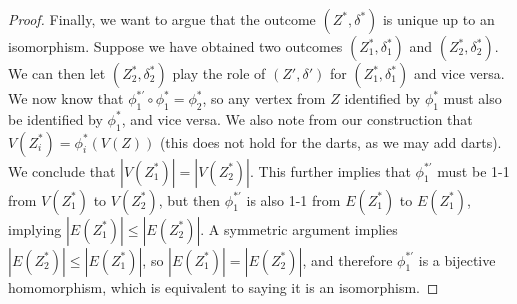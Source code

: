 \documentclass[10pt,a4paper]{amsart}
\begin{document}
\begin{proof}
Finally, we want to argue that the outcome $(Z^*,\delta^*)$ is unique up to an isomorphism. 
Suppose we have obtained two outcomes $(Z^*_1,\delta^*_1)$ and
$(Z^*_2,\delta^*_2)$. We can then let $(Z^*_2,\delta^*_2)$ play the role of $(Z',\delta')$ for $(Z^*_1,\delta^*_1)$ and vice versa. We now know that $\phi^{*\prime}_1\circ \phi^*_1=\phi^*_2$, so any vertex from $Z$ identified by $\phi^*_1$ must also be identified by $\phi^*_1$, and vice versa. We also note from
our construction that $V(Z^*_i)=\phi_i^*(V(Z))$ (this does not hold for the darts, as we may add darts). We conclude that $|V(Z^*_1)|=|V(Z^*_2)|$. This further implies that $\phi^{*\prime}_1$ must be 1-1 from $V(Z^*_1)$ to $V(Z^*_2)$, but then 
$\phi^{*\prime}_1$ is also
1-1 from $E(Z^*_1)$
to $E(Z^*_1)$, implying $|E(Z^*_1)|\leq |E(Z^*_2)|$. A symmetric argument implies
$|E(Z^*_2)|\leq |E(Z^*_1)|$, so
$|E(Z^*_1)|=|E(Z^*_2)|$, and therefore $\phi^{*\prime}_1$
is a bijective homomorphism, which is equivalent to saying it is an isomorphism.
\end{proof}
\end{document}
